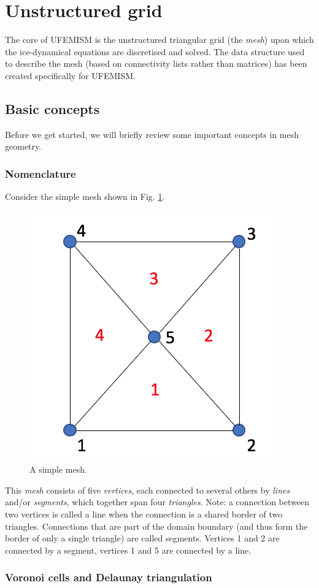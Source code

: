 \documentclass{article}
\begin{document}
\newpage
\section{Unstructured grid}

The core of UFEMISM is the unstructured triangular grid (the \emph{mesh}) upon which the ice-dynamical equations are discretised and solved. The data structure used
to describe the mesh (based on connectivity lists rather than matrices) has been created specifically for UFEMISM.

\subsection{Basic concepts}

Before we get started, we will briefly review some important concepts in mesh geometry.

\subsubsection{Nomenclature}

Consider the simple mesh shown in Fig. \ref{fig:dummymesh}.

\begin{figure}[h!] \label{fig:dummymesh}
  \includegraphics[width=0.3\linewidth]{Fig_dummymesh_02.png}
  \caption{A simple mesh.}
\end{figure}

This \emph{mesh} consists of five \emph{vertices}, each connected to several others by \emph{lines} and/or \emph{segments}, which together span four \emph{triangles}. Note: a connection between two vertices is called a line when the connection is a shared border of two triangles. Connections that are part of the domain boundary (and thus form the border of only a single triangle) are called segments. Vertices 1 and 2 are connected by a segment, vertices 1 and 5 are connected by a line.

\subsubsection{Voronoi cells and Delaunay triangulation}
\end{document}
